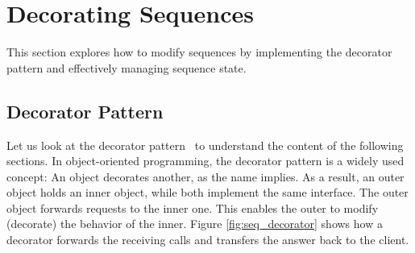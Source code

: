 \section{Decorating Sequences}
\label{sec:Decorating Sequences}
This section explores how to modify sequences by implementing the decorator 
pattern and effectively managing sequence state.

\subsection{Decorator Pattern}
\label{sub:Decorator Pattern}
Let us look at the decorator pattern~\cite[p.~226]{gang_of_four_depa} to understand the content of the 
following sections. In object-oriented programming, the decorator pattern is a 
widely used concept: An object decorates another, as the name implies. As a 
result, an outer object holds an inner object, while both implement the same 
interface. The outer object forwards requests to the inner one. This enables
the outer to modify (decorate) the behavior of the inner. 
Figure \ref{fig:seq_decorator} shows how a decorator forwards the receiving calls and 
transfers the answer back to the client.

